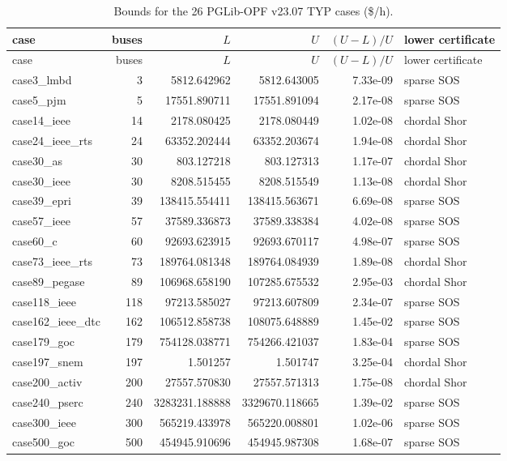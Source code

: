 \begin{longtable}{@{}l r r r r l@{}}\caption{Bounds for the 26 PGLib-OPF v23.07 TYP cases (\$/h).}\label{tab:results}\\\toprule
case & buses & $L$ & $U$ & $(U-L)/U$ & lower certificate\\\midrule\endfirsthead\toprule case & buses & $L$ & $U$ & $(U-L)/U$ & lower certificate\\\midrule\endhead
case3\_lmbd & 3 & 5812.642962 & 5812.643005 & 7.33e-09 & sparse SOS\\
case5\_pjm & 5 & 17551.890711 & 17551.891094 & 2.17e-08 & sparse SOS\\
case14\_ieee & 14 & 2178.080425 & 2178.080449 & 1.02e-08 & chordal Shor\\
case24\_ieee\_rts & 24 & 63352.202444 & 63352.203674 & 1.94e-08 & chordal Shor\\
case30\_as & 30 & 803.127218 & 803.127313 & 1.17e-07 & chordal Shor\\
case30\_ieee & 30 & 8208.515455 & 8208.515549 & 1.13e-08 & chordal Shor\\
case39\_epri & 39 & 138415.554411 & 138415.563671 & 6.69e-08 & sparse SOS\\
case57\_ieee & 57 & 37589.336873 & 37589.338384 & 4.02e-08 & sparse SOS\\
case60\_c & 60 & 92693.623915 & 92693.670117 & 4.98e-07 & sparse SOS\\
case73\_ieee\_rts & 73 & 189764.081348 & 189764.084939 & 1.89e-08 & chordal Shor\\
case89\_pegase & 89 & 106968.658190 & 107285.675532 & 2.95e-03 & chordal Shor\\
case118\_ieee & 118 & 97213.585027 & 97213.607809 & 2.34e-07 & sparse SOS\\
case162\_ieee\_dtc & 162 & 106512.858738 & 108075.648889 & 1.45e-02 & sparse SOS\\
case179\_goc & 179 & 754128.038771 & 754266.421037 & 1.83e-04 & sparse SOS\\
case197\_snem & 197 & 1.501257 & 1.501747 & 3.25e-04 & chordal Shor\\
case200\_activ & 200 & 27557.570830 & 27557.571313 & 1.75e-08 & chordal Shor\\
case240\_pserc & 240 & 3283231.188888 & 3329670.118665 & 1.39e-02 & sparse SOS\\
case300\_ieee & 300 & 565219.433978 & 565220.008801 & 1.02e-06 & sparse SOS\\
case500\_goc & 500 & 454945.910696 & 454945.987308 & 1.68e-07 & sparse SOS\\

\end{longtable}
